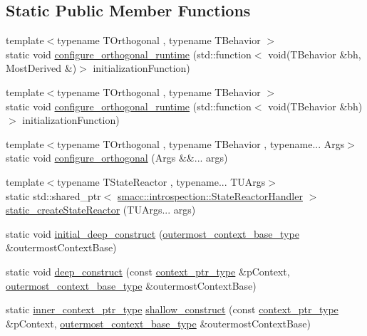 \subsection*{Static Public Member Functions}
\begin{DoxyCompactItemize}
\item 
{\footnotesize template$<$typename T\+Orthogonal , typename T\+Behavior $>$ }\\static void \hyperlink{classsmacc_1_1SmaccState_ad70d7004c9bb0eb1621e68a223cfd2ef}{configure\+\_\+orthogonal\+\_\+runtime} (std\+::function$<$ void(T\+Behavior \&bh, Most\+Derived \&)$>$ initialization\+Function)
\item 
{\footnotesize template$<$typename T\+Orthogonal , typename T\+Behavior $>$ }\\static void \hyperlink{classsmacc_1_1SmaccState_afe48d925910d9c691324ac3159a1bf10}{configure\+\_\+orthogonal\+\_\+runtime} (std\+::function$<$ void(T\+Behavior \&bh)$>$ initialization\+Function)
\item 
{\footnotesize template$<$typename T\+Orthogonal , typename T\+Behavior , typename... Args$>$ }\\static void \hyperlink{classsmacc_1_1SmaccState_a9a9238f3f8dc18825771f64aefbc803a}{configure\+\_\+orthogonal} (Args \&\&... args)
\item 
{\footnotesize template$<$typename T\+State\+Reactor , typename... T\+U\+Args$>$ }\\static std\+::shared\+\_\+ptr$<$ \hyperlink{classsmacc_1_1introspection_1_1StateReactorHandler}{smacc\+::introspection\+::\+State\+Reactor\+Handler} $>$ \hyperlink{classsmacc_1_1SmaccState_a21ccc458f911ecc1e9a52287f7793ef8}{static\+\_\+create\+State\+Reactor} (T\+U\+Args... args)
\item 
static void \hyperlink{classsmacc_1_1SmaccState_af4b4635d16a32bdd3956e5d40ddbd01d}{initial\+\_\+deep\+\_\+construct} (\hyperlink{classsmacc_1_1SmaccState_aaf76bbe2aa9dd73e3284605f84ab4b16}{outermost\+\_\+context\+\_\+base\+\_\+type} \&outermost\+Context\+Base)
\item 
static void \hyperlink{classsmacc_1_1SmaccState_aac23d8a6909f75c5e5fca2a7c09b5368}{deep\+\_\+construct} (const \hyperlink{classsmacc_1_1SmaccState_a0e15b77514301039f6bc093a9d3f6425}{context\+\_\+ptr\+\_\+type} \&p\+Context, \hyperlink{classsmacc_1_1SmaccState_aaf76bbe2aa9dd73e3284605f84ab4b16}{outermost\+\_\+context\+\_\+base\+\_\+type} \&outermost\+Context\+Base)
\item 
static \hyperlink{classsmacc_1_1SmaccState_a65a772c2e2039e9a59148ba6ffb54d8a}{inner\+\_\+context\+\_\+ptr\+\_\+type} \hyperlink{classsmacc_1_1SmaccState_a1dccb401e1a99031863a21a590d953e6}{shallow\+\_\+construct} (const \hyperlink{classsmacc_1_1SmaccState_a0e15b77514301039f6bc093a9d3f6425}{context\+\_\+ptr\+\_\+type} \&p\+Context, \hyperlink{classsmacc_1_1SmaccState_aaf76bbe2aa9dd73e3284605f84ab4b16}{outermost\+\_\+context\+\_\+base\+\_\+type} \&outermost\+Context\+Base)
\end{DoxyCompactItemize}
